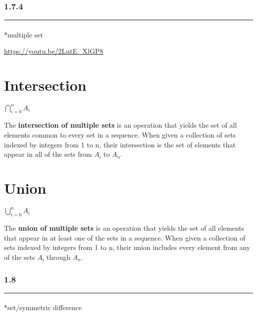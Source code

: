 \documentclass[
  letterpaper,
  DIV=11,
  numbers=noendperiod]{scrreprt}
\makeatletter
\let\oldparagraph\paragraph
\renewcommand{\paragraph}{
    \@ifstar
      \xxxParagraphStar
      \xxxParagraphNoStar
  }
\newcommand{\xxxParagraphStar}[1]{\oldparagraph*{#1}\mbox{}}
\newcommand{\xxxParagraphNoStar}[1]{\oldparagraph{#1}\mbox{}}
\makeatother
\begin{document}
\subsubsection*{1.7.4}\label{section-12}

\begin{center}\rule{0.5\linewidth}{0.5pt}\end{center}

\paragraph*{multiple set}\label{multiple-set}

\url{https://youtu.be/2LutE_XlGP8}

\section{Intersection}

\(\bigcap^n_{i=0} A_i\)

The {\textbf{intersection of multiple sets}} is an operation that yields
the set of all elements common to every set in a sequence. When given a
collection of sets indexed by integers from 1 to n, their intersection
is the set of elements that appear in all of the sets from
{\(A_\imath\)} to {\(A_n\)}.

\section{Union}

\(\bigcup^n_{i=0} A_i\)

The {\textbf{union of multiple sets}} is an operation that yields the
set of all elements that appear in at least one of the sets in a
sequence. When given a collection of sets indexed by integers from 1 to
n, their union includes every element from any of the sets
{\(A_\imath\)} through {\(A_n\)}.

\subsubsection*{1.8}\label{section-13}

\begin{center}\rule{0.5\linewidth}{0.5pt}\end{center}

\paragraph*{set/symmetric difference}\label{setsymmetric-difference}
\end{document}
